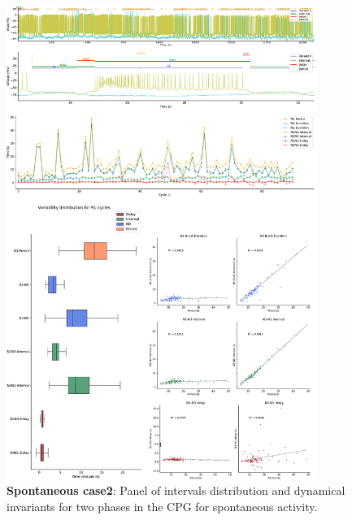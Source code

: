 \begin{figure}[htbp]
	\centering
	\includegraphics[width=0.9\textwidth]{./invariants/data/SUSSEX/prep2/images/2phases/panel_with_intervals.pdf}
	\caption{\textbf{Spontaneous case2}: Panel of intervals distribution and dynamical invariants for two phases in the CPG for spontaneous activity.}
	\label{fig:prep2 2phase invariants}
\end{figure}

